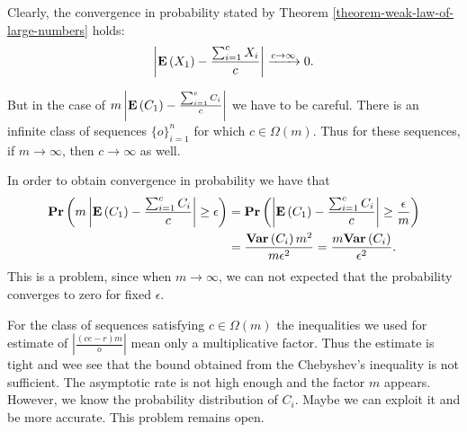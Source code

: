 Clearly, the convergence in probability stated by Theorem \ref{theorem-weak-law-of-large-numbers} holds:
\[
	\left|\mathbf{E}\left(X_1\right) - \frac{\sum\displaylimits_{i = 1}^{c} X_i}{c}\right| \xrightarrow{c \rightarrow \infty} 0 \text{.}
\]

But in the case of $m \left|\mathbf{E}\left(C_1\right) - \frac{\sum\displaylimits_{i = 1}^{c} C_i}{c}\right|$ we have to be careful. There is an infinite class of sequences $\{o\}_{i = 1}^{n}$ for which $c \in \Omega(m)$. Thus for these sequences, if $m \rightarrow \infty$, then $c \rightarrow \infty$ as well.

In order to obtain convergence in probability we have that
\[
\begin{split}
\mathbf{Pr}\left(m \left|\mathbf{E}\left(C_1\right) - \frac{\sum\displaylimits_{i = 1}^{c} C_i}{c}\right| \geq \epsilon\right) 
	& = \mathbf{Pr}\left(\left|\mathbf{E}\left(C_1\right) - \frac{\sum\displaylimits_{i = 1}^{c} C_i}{c}\right| \geq \frac{\epsilon}{m}\right)  \\
	& = \frac{\mathbf{Var}\left(C_i\right) m ^ 2}{m \epsilon ^ 2} = \frac{m\mathbf{Var}\left(C_i\right)}{\epsilon ^ 2} \text{.}
\end{split}
\]
This is a problem, since when $m \rightarrow \infty$, we can not expected that the probability converges to zero for fixed $\epsilon$. 

 For the class of sequences satisfying $c \in \Omega(m)$ the inequalities we used for estimate of $\left|\frac{(ce - r)m}{o}\right|$ mean only a multiplicative factor. Thus the estimate is tight and wee see that the bound obtained from the Chebyshev's inequality is not sufficient. The asymptotic rate is not high enough and the factor $m$ appears. However, we know the probability distribution of $C_i$. Maybe we can exploit it and be more accurate. This problem remains open.



